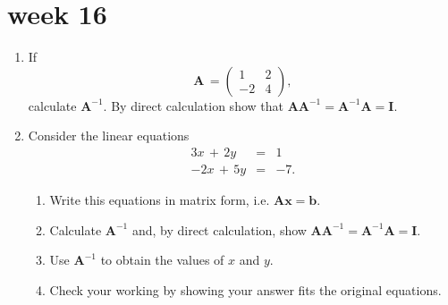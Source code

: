 \documentclass[11pt,a4paper]{article}
\def\bA{\mathbf{A}}
\def\bI{\mathbf{I}}
\begin{document}
\section*{week 16}
\begin{enumerate}
 

\item\label{q1171}  If
 \[\bA \,= \left( \begin{array}{rr} 1&2\\-2&4 \end{array} \right),\] calculate
$\bA^{-1}$.   By direct calculation show that
 $\bA\bA^{-1} =\bA^{-1}\bA=\bI $.

%


\item\label{q1172} Consider the linear equations
\begin{eqnarray*}
3x\,+\,2y&=&1\\ 
-2x\,+\,5y&=&-7.
\end{eqnarray*}
	\begin{enumerate}
	\item Write this equations in matrix form, i.e. $\bA \mathbf{x}=\mathbf{b}$.
	\item Calculate $\bA^{-1}$ and, by direct calculation, show $\bA \bA^{-1} = \bA^{-1} \bA =\bI $.
	\item Use $\bA^{-1}$ to obtain the values of $x$ and $y$.
	\item Check your working by showing your answer fits the original equations.
	\end{enumerate}

%


\end{enumerate}
\end{document}
